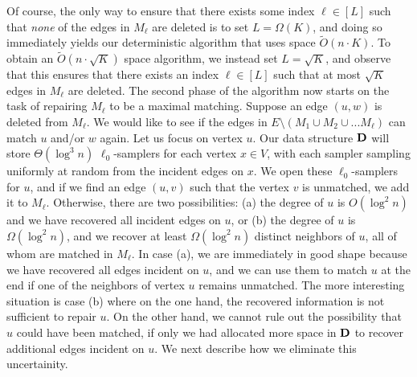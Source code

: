 \documentclass[11pt,a4paper]{article}
\newcommand{\D}{\mathsf{\bf D}}
\begin{document}
Of course, the only way to ensure that there exists some index $\ell \in [L]$ such that {\em none} of the edges in $M_{\ell}$ are deleted is to set $L = \Omega(K)$, and doing so immediately yields our deterministic algorithm that uses space $\tilde{O}(n \cdot K)$.  %
To obtain an $\tilde{O}(n \cdot \sqrt{K})$ space algorithm, we instead set $L = \sqrt{K}$, and observe that this ensures that there exists an index $\ell \in [L]$ such that at most $\sqrt{K}$ edges in $M_{\ell}$ are deleted. The second phase of the algorithm now starts on the task of repairing $M_{\ell}$ to be a maximal matching. Suppose an edge $(u,w)$ is deleted from $M_{\ell}$. We would like to see if the edges in $E \setminus (M_1 \cup M_2 \cup ... M_{\ell})$ can match $u$ and/or $w$ again. Let us focus on vertex $u$. Our data structure $\D$ will store $\Theta(\log^3 n)$ $\ell_0$-samplers for each vertex $x \in V$, with each sampler sampling uniformly at random from the incident edges on $x$. We open these $\ell_0$-samplers for $u$, and if we find an edge $(u,v)$ such that the vertex $v$ is unmatched, we add it to $M_{\ell}$. Otherwise, there are two possibilities: (a) the degree of $u$ is $O(\log^2 n)$ and we have recovered all incident edges on $u$, or (b) the degree of $u$ is $\Omega(\log^2 n)$, and we recover at least $\Omega(\log^2 n)$ distinct neighbors of $u$, all of whom are matched in $M_{\ell }$. In case (a), we are immediately in good shape because we have recovered all edges incident on $u$, and we can use them to match $u$ at the end if one of the neighbors of vertex $u$ remains unmatched. The more interesting situation is case (b) where on the one hand, the recovered information is not sufficient to repair $u$. On the other hand, we cannot rule out the possibility that $u$ could have been matched, if only we had allocated more space in $\D$ to recover additional edges incident on $u$. We next describe how we eliminate this uncertainity.
\end{document}
